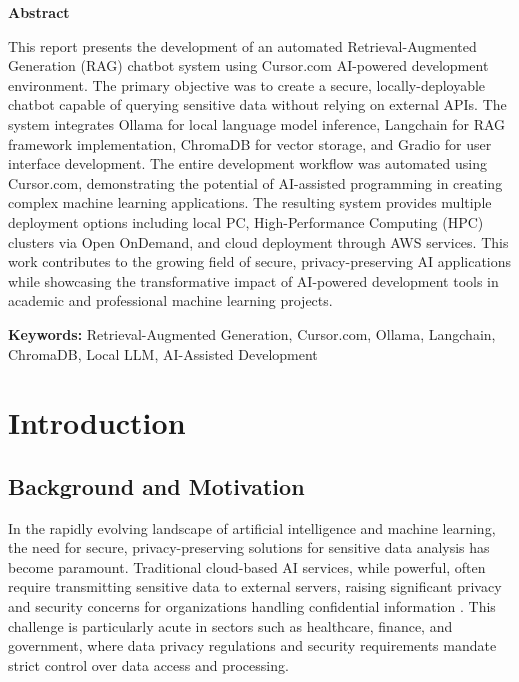 \date{\today}



\maketitle


\textbf{Abstract}

This report presents the development of an automated Retrieval-Augmented Generation (RAG) chatbot system using Cursor.com AI-powered development environment. The primary objective was to create a secure, locally-deployable chatbot capable of querying sensitive data without relying on external APIs. The system integrates Ollama for local language model inference, Langchain for RAG framework implementation, ChromaDB for vector storage, and Gradio for user interface development. The entire development workflow was automated using Cursor.com, demonstrating the potential of AI-assisted programming in creating complex machine learning applications. The resulting system provides multiple deployment options including local PC, High-Performance Computing (HPC) clusters via Open OnDemand, and cloud deployment through AWS services. This work contributes to the growing field of secure, privacy-preserving AI applications while showcasing the transformative impact of AI-powered development tools in academic and professional machine learning projects.

\textbf{Keywords:} Retrieval-Augmented Generation, Cursor.com, Ollama, Langchain, ChromaDB, Local LLM, AI-Assisted Development

\newpage

\section{Introduction}

\subsection{Background and Motivation}

In the rapidly evolving landscape of artificial intelligence and machine learning, the need for secure, privacy-preserving solutions for sensitive data analysis has become paramount. Traditional cloud-based AI services, while powerful, often require transmitting sensitive data to external servers, raising significant privacy and security concerns for organizations handling confidential information \citep{li2021survey}. This challenge is particularly acute in sectors such as healthcare, finance, and government, where data privacy regulations and security requirements mandate strict control over data access and processing.

